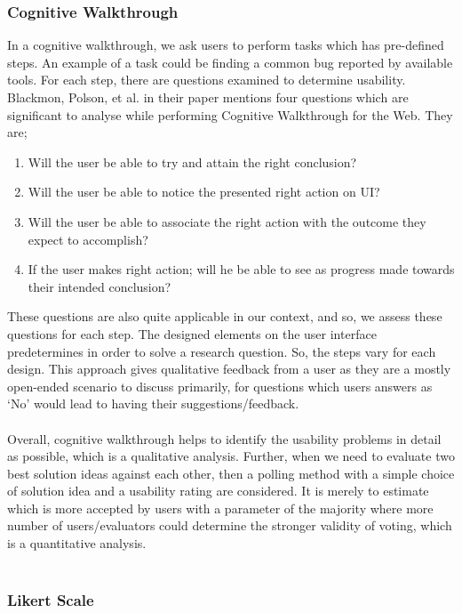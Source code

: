 \subsubsection{Cognitive Walkthrough}

In a cognitive walkthrough, we ask users to perform tasks which has pre-defined steps. An example of a task could be finding a common bug reported by available tools. For each step, there are questions examined to determine usability. Blackmon, Polson, et al. in their paper \cite{blackmon2002cognitive} mentions four questions which are significant to analyse while performing Cognitive Walkthrough for the Web. They are;

\begin{enumerate}
\item Will the user be able to try and attain the right conclusion?
\item Will the user be able to notice the presented right action on UI?
\item Will the user be able to associate the right action with the outcome they expect to accomplish?
\item If the user makes right action; will he be able to see as progress made towards their intended conclusion?
\end{enumerate}

These questions are also quite applicable in our context, and so, we assess these questions for each step. The designed elements on the user interface predetermines in order to solve a research question. So, the steps vary for each design. This approach gives qualitative feedback from a user as they are a mostly open-ended scenario to discuss primarily, for questions which users answers as ‘No’ would lead to having their suggestions/feedback. \\ \\

Overall, cognitive walkthrough helps to identify the usability problems in detail as possible, which is a qualitative analysis. Further, when we need to evaluate two best solution ideas against each other, then a polling method with a simple choice of solution idea and a usability rating are considered. It is merely to estimate which is more accepted by users with a parameter of the majority where more number of users/evaluators could determine the stronger validity of voting, which is a quantitative analysis. \\ \\

\subsubsection{Likert Scale}

